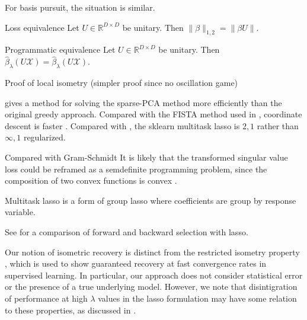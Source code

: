For basis pursuit, the situation is similar.

 \begin{proposition}{Loss equivalence}
 \label{prop:basis_pursuit_loss_equivalence}
 Let $U \in \mathbb R^{D \times D}$ be unitary.
 Then $\|\beta\|_{1,2} = \|\beta U \|$.
\end{proposition}

 \begin{proposition}{Programmatic equivalence}
 \label{prop:basis_pursuit_loss_equivalence}
 Let $U \in \mathbb R^{D \times D}$ be unitary.
 Then $\hat \beta_{\lambda}  (U \mathcal X) = \hat \beta_{\lambda}  (U \mathcal X)$.
\end{proposition}


Proof of local isometry (simpler proof since no oscillation game)


\cite{Bertsimas2022-qo} gives a method for solving the sparse-PCA method more efficiently than the original greedy approach.
Compared with the FISTA method used in  \cite{Koelle2022-ju, Koelle2024-no}, coordinate descent \cite{Friedman-2007-yb, Meier2008-ts, Qin2013-tx} is faster \cite{Catalina2018-ek, Zhao2023-xn}.
Compared with \cite{Liu2009-yo}, the sklearn multitask lasso is $2,1$ rather than $\infty,1$ regularized.

Compared with Gram-Schmidt
It is likely that the transformed singular value loss could be reframed as a semdefinite programming problem, since the composition of two convex functions is convex \cite{Boyd2004-ql}.

Multitask lasso \cite{Obozinski2006-kq, Yeung2011-fg} is a form of group lasso \cite{Yuan2006-bt} where coefficients are group by response variable.

See \cite{Obozinski2006-kq} for a comparison of forward and backward selection with lasso.

Our notion of isometric recovery is distinct from the restricted isometry property \cite{Candes2005-dd, Hastie2015-qa}, which is used to show guaranteed recovery at fast convergence rates in supervised learning.
In particular, our approach does not consider statistical error or the presence of a true underlying model.
However, we note that disintigration of performance at high $\lambda$ values in the lasso formulation may have some relation to these properties, as discussed in \cite{Koelle2022-ju, Koelle2024-no}.

